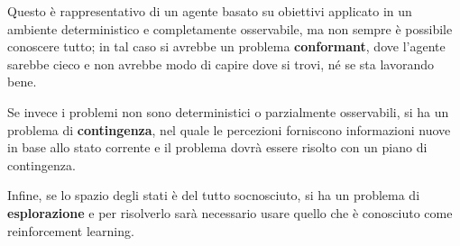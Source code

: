 \noindent Questo è rappresentativo di un agente basato su obiettivi applicato in un ambiente deterministico e completamente osservabile, ma non sempre
è possibile conoscere tutto; in tal caso si avrebbe un problema \textbf{conformant}, dove l'agente sarebbe cieco e non avrebbe modo di capire dove si
trovi, né se sta lavorando bene.\par
Se invece i problemi non sono deterministici o parzialmente osservabili, si ha un problema di \textbf{contingenza}, nel quale le percezioni forniscono
informazioni nuove in base allo stato corrente e il problema dovrà essere risolto con un piano di contingenza.\par
Infine, se lo spazio degli stati è del tutto socnosciuto, si ha un problema di \textbf{esplorazione} e per risolverlo sarà necessario usare quello che
è conosciuto come reinforcement learning.